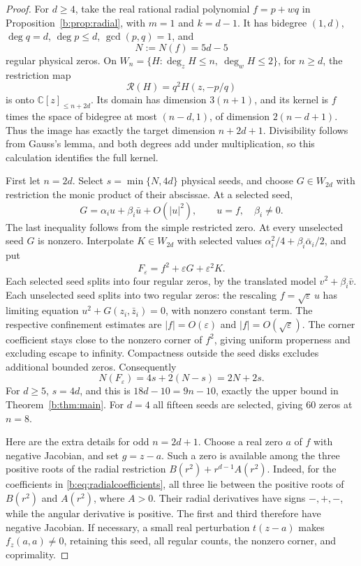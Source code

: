 \documentclass[UTF8,11pt]{ctexart}
\theoremstyle{definition}
\numberwithin{equation}{section}
\begin{document}
\begin{proof}
For $d\ge4$, take the real rational radial polynomial
$f=p+wq$ in Proposition~\ref{b:prop:radial}, with $m=1$
and $k=d-1$. It has bidegree $(1,d)$, $\deg q=d$,
$\deg p\le d$, $\gcd(p,q)=1$, and
\[
                           N:=N(f)=5d-5
\]
regular physical zeros. On
$W_n=\{H:\deg_zH\le n,\ \deg_wH\le2\}$, for $n\ge d$,
the restriction map
\[
                  \mathcal R(H)=q^2H(z,-p/q)
\]
is onto $\mathbb C[z]_{\le n+2d}$. Its domain has
dimension $3(n+1)$, and its kernel is $f$ times the space
of bidegree at most $(n-d,1)$, of dimension $2(n-d+1)$.
Thus the image has exactly the target dimension $n+2d+1$.
Divisibility follows from Gauss's lemma, and both degrees add
under multiplication, so this calculation identifies the full
kernel.

First let $n=2d$. Select $s=\min\{N,4d\}$ physical seeds,
and choose $G\in W_{2d}$ with restriction the monic product
of their abscissae. At a selected seed,
\[
                     G=\alpha_i u+\beta_i\bar u+O(|u|^2),
                     \qquad u=f,\quad\beta_i\ne0.
\]
The last inequality follows from the simple restricted zero.
At every unselected seed $G$ is nonzero. Interpolate
$K\in W_{2d}$ with selected values
$\alpha_i^2/4+\beta_i\bar\alpha_i/2$, and put
\[
                           F_\varepsilon=f^2+
                                  \varepsilon G+\varepsilon^2K.
\]
Each selected seed splits into four regular zeros, by the
translated model $v^2+\beta_i\bar v$.
Each unselected seed splits into two regular zeros: the
rescaling $f=\sqrt\varepsilon\,u$ has limiting equation
$u^2+G(z_i,\bar z_i)=0$, with nonzero constant term.
The respective confinement estimates are
$|f|=O(\varepsilon)$ and $|f|=O(\sqrt\varepsilon)$.
The corner coefficient stays close to the nonzero corner
of $f^2$, giving uniform properness and excluding escape
to infinity. Compactness outside the seed disks excludes
additional bounded zeros. Consequently
\begin{equation}\label{v40:eq:selectivecount}
                   N(F_\varepsilon)=4s+2(N-s)=2N+2s.
\end{equation}
For $d\ge5$, $s=4d$, and this is
$18d-10=9n-10$, exactly the upper bound in
Theorem~\ref{b:thm:main}. For $d=4$ all fifteen seeds
are selected, giving $60$ zeros at $n=8$.

Here are the extra details for odd $n=2d+1$.
Choose a real zero $a$ of $f$ with negative Jacobian, and
set $g=z-a$. Such a zero is available among the three
positive roots of the radial restriction $B(r^2)+r^{d-1}A(r^2)$.
Indeed, for the coefficients in \eqref{b:eq:radialcoefficients},
all three lie between the positive roots of $B(r^2)$ and
$A(r^2)$, where $A>0$. Their radial derivatives have
signs $-,+,-$, while the angular derivative is positive.
The first and third therefore have negative Jacobian.
If necessary, a small real perturbation $t(z-a)$ makes
$f_z(a,a)\ne0$, retaining this seed, all regular counts,
the nonzero corner, and coprimality.


\end{proof}
\end{document}
